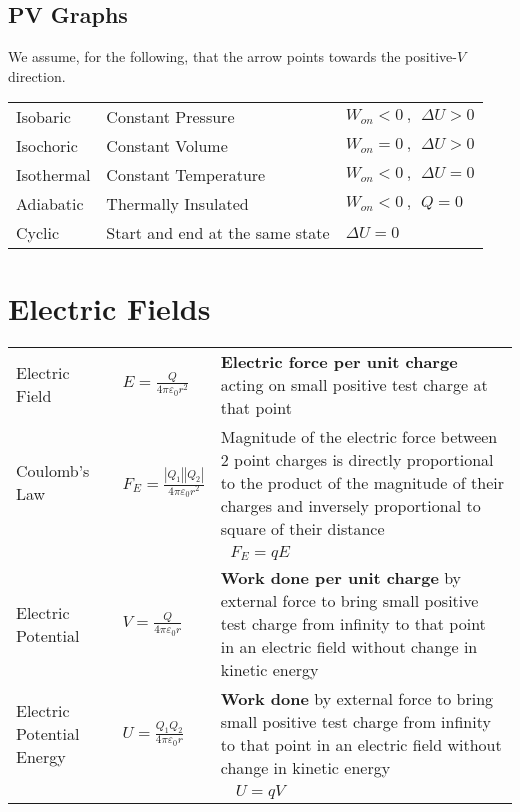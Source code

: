 \documentclass[a4paper]{article}
\begin{document}
		\subsection{PV Graphs}
			We assume, for the following, that the arrow points towards the positive-$V$ direction. 
			\begin{center}
				\renewcommand{\arraystretch}{1.2}
				\begin{tabular}{@{} l l l @{}}
					\toprule
					Isobaric & Constant Pressure  & $W_{on} < 0 ~,~~ \Delta U > 0$\\
					Isochoric & Constant Volume & $W_{on} = 0 ~,~~ \Delta U > 0$\\
					Isothermal & Constant Temperature & $W_{on} < 0 ~,~~ \Delta U = 0$\\
					Adiabatic & Thermally Insulated & $W_{on} < 0 ~,~~ Q = 0$\\
					Cyclic & Start and end at the same state & $\Delta U = 0$\\
					\bottomrule
				\end{tabular}
			\end{center}
	\section{Electric Fields}
	\begin{center}
		\renewcommand{\arraystretch}{1.2}
		\begin{tabular}{@{} l l p{8.5cm} @{}}
			\toprule
			Electric Field & $\displaystyle E=\frac{Q}{4\pi \varepsilon_0 r^2}$ & \textbf{Electric force per unit charge} acting on small positive test charge at that point \\
			Coulomb's Law & $\displaystyle F_E=\frac{|Q_1||Q_2|}{4\pi \varepsilon_0 r^2}$ & Magnitude of the electric force between 2 point charges is directly proportional to the product of the magnitude of their charges and inversely proportional to square of their distance\\
			\multicolumn{3}{c}{$F_E=qE$} \\
			\midrule
			Electric Potential & $\displaystyle V = \frac{Q}{4\pi \varepsilon_0 r}$ & \textbf{Work done per unit charge} by external force to bring small positive test charge from infinity to that point in an electric field without change in kinetic energy \\
			Electric Potential Energy & $\displaystyle U = \frac{Q_1 Q_2}{4\pi \varepsilon_0 r}$ & \textbf{Work done } by external force to bring small positive test charge from infinity to that point in an electric field without change in kinetic energy\\
			\multicolumn{3}{c}{$U=qV$} \\
			\bottomrule
		\end{tabular}
	\end{center}
	
\end{document}
